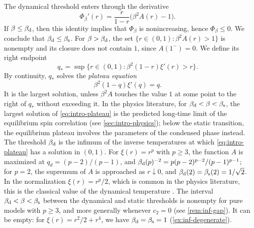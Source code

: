 The dynamical threshold enters through the derivative
\begin{equation*}
\Phi_\beta'(r)=\frac r{1-r}\bigl(\beta^2A(r)-1\bigr).
\end{equation*}
If $\beta\le\beta_{\mathrm d}$, then this identity implies that $\Phi_\beta$ is nonincreasing, hence $\Phi_\beta\le0$. We conclude that $\beta_{\mathrm d}\le\beta_{\mathrm s}$. For $\beta>\beta_{\mathrm d}$, the set $\{r\in(0,1):\beta^2A(r)>1\}$ is nonempty and its closure does not contain $1$, since $A(1^-)=0$. We define its right endpoint
\begin{equation}\label{eq:intro-qstar}
q_*=\sup\bigl\{r\in(0,1):\beta^2(1-r)\xi'(r)>r\bigr\}.
\end{equation}
By continuity, $q_*$ solves the \emph{plateau equation}
\begin{equation}\label{eq:intro-plateau}
\beta^2(1-q)\xi'(q)=q.
\end{equation}
It is the largest solution, unless $\beta^2A$ touches the value $1$ at some point to the right of $q_*$ without exceeding it. In the physics literature, for $\beta_{\mathrm d}<\beta<\beta_{\mathrm s}$, the largest solution of \eqref{eq:intro-plateau} is the predicted long-time limit of the equilibrium spin correlation (see \cref{sec:intro-physics}); below the static transition, the equilibrium plateau involves the parameters of the condensed phase instead. The threshold $\beta_{\mathrm d}$ is the infimum of the inverse temperatures at which \eqref{eq:intro-plateau} has a solution in $(0,1)$. For $\xi(r)=r^p$ with $p\ge3$, the function $A$ is maximized at $q_d=(p-2)/(p-1)$, and $\beta_{\mathrm d}(p)^{-2}=p(p-2)^{p-2}/(p-1)^{p-1}$; for $p=2$, the supremum of $A$ is approached as $r\downarrow0$, and $\beta_{\mathrm d}(2)=\beta_{\mathrm s}(2)=1/\sqrt2$. In the normalization $\xi(r)=r^p/2$, which is common in the physics literature, this is the classical value of the dynamical temperature \cite[Section~4.5]{CastellaniCavagna2005}. The interval $\beta_{\mathrm d}<\beta<\beta_{\mathrm s}$ between the dynamical and static thresholds is nonempty for pure models with $p\ge3$, and more generally whenever $c_2=0$ (see \cref{rem:inf-gap}). It can be empty: for $\xi(r)=r^2/2+r^4$, we have $\beta_{\mathrm d}=\beta_{\mathrm s}=1$ (\cref{ex:inf-degenerate}).

